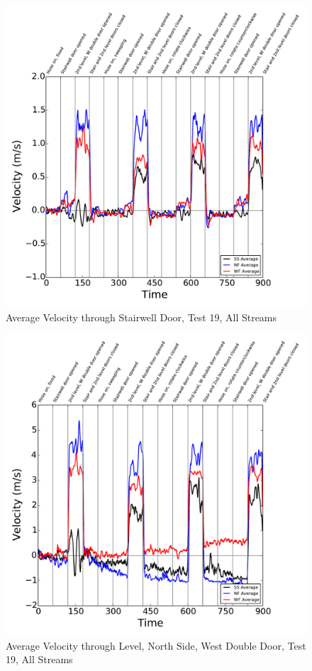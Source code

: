 \documentclass[12pt,oneside]{book}
\begin{document}
\clearpage

\begin{figure}[!ht]
\includegraphics[width=6in]{../../../Figures/Hose_Test_Figures/Test_19_West_063014_BDP_A10_Avg}
\caption{Average Velocity through Stairwell Door, Test 19, All Streams}
\label{fig:Test_19_BDP_A10_Avg_All}
\end{figure}

\begin{figure}[!ht]
\includegraphics[width=6in]{../../../Figures/Hose_Test_Figures/Test_19_West_063014_BDP_A13_Avg}
\caption{Average Velocity through  Level, North Side, West Double Door, Test 19, All Streams}
\label{fig:Test_19_BDP_A13_Avg_All}
\end{figure}
\end{document}

